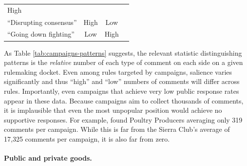 \documentclass[
      12pt,
        ]{article}
\begin{document}
\begin{longtable}[]{@{}lccc@{}}
\begin{minipage}[t]{0.23\columnwidth}
High\strut
\end{minipage} & \begin{minipage}[t]{0.23\columnwidth}\centering
\strut
\end{minipage}\tabularnewline
\begin{minipage}[t]{0.19\columnwidth}\raggedright
``Disrupting consensus''\strut
\end{minipage} & \begin{minipage}[t]{0.23\columnwidth}\centering
High\strut
\end{minipage} & \begin{minipage}[t]{0.23\columnwidth}\centering
Low\strut
\end{minipage} & \begin{minipage}[t]{0.23\columnwidth}\centering
\strut
\end{minipage}\tabularnewline
\begin{minipage}[t]{0.19\columnwidth}\raggedright
``Going down fighting''\strut
\end{minipage} & \begin{minipage}[t]{0.23\columnwidth}\centering
Low\strut
\end{minipage} & \begin{minipage}[t]{0.23\columnwidth}\centering
High\strut
\end{minipage} & \begin{minipage}[t]{0.23\columnwidth}\centering
\strut
\end{minipage}\tabularnewline
\bottomrule
\end{longtable}

As Table
\ref{tab:campaigns-patterns} suggests, the relevant statistic
distinguishing patterns is the \emph{relative} number of each type of comment
on each side on a given rulemaking docket. Even among rules targeted by
campaigns, salience varies significantly and thus ``high'' and ``low''
numbers of comments will differ across rules. Importantly, even
campaigns that achieve very low public response rates appear in these
data. Because campaigns aim to collect thousands of comments, it is
implausible that even the most unpopular position would achieve no
supportive responses. For example, \citet{Potter2017} found Poultry Producers
averaging only 319 comments per campaign. While this is far from the
Sierra Club's average of 17,325 comments per campaign, it is also far
from zero.

\hypertarget{public-and-private-goods.}{%
\paragraph{Public and private goods.}\label{public-and-private-goods.}}
\end{document}
